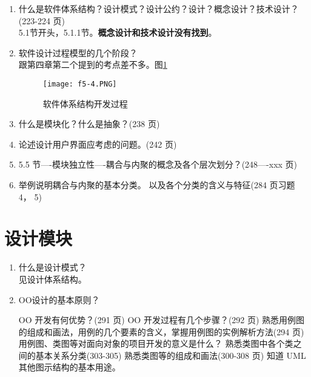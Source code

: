 \documentclass[14pt, letterpaper, UTF8, fontset=windowsnew, heading=true]{article}
\begin{document}
\begin{enumerate}
	\item 什么是软件体系结构？设计模式？设计公约？设计？概念设计？技术设计？(223-224
	页) \\
	5.1节开头，5.1.1节。\textbf{概念设计和技术设计没有找到}。
	
	\item 软件设计过程模型的几个阶段？ \\
	跟第四章第二个提到的考点差不多。图\ref{fig:archtechturedev}
	\begin{figure}[h]
		\centering
		\texttt{[image: f5-4.PNG]}
		\caption{软件体系结构开发过程}
		\label{fig:archtechturedev}
	\end{figure}
	
	
	\item 什么是模块化？什么是抽象？(238 页) \\
	
	\item 论述设计用户界面应考虑的问题。(242 页) \\
	
	\item 5.5 节----模块独立性----耦合与内聚的概念及各个层次划分？(248----xxx 页) \\
	
	\item 举例说明耦合与内聚的基本分类。 以及各个分类的含义与特征(284 页习题 4， 5) \\
\end{enumerate}

\section{设计模块}

\begin{enumerate}

	\item 什么是设计模式？ \\
	见设计体系结构。
	
	\item OO设计的基本原则？
	
	OO 开发有何优势？(291 页)
	OO 开发过程有几个步骤？(292 页)
	熟悉用例图的组成和画法，用例的几个要素的含义，掌握用例图的实例解析方法(294
	页)
	用例图、类图等对面向对象的项目开发的意义是什么？
	熟悉类图中各个类之间的基本关系分类(303-305)
	熟悉类图等的组成和画法(300-308 页)
	知道 UML 其他图示结构的基本用途。
\end{enumerate}
\end{document}
